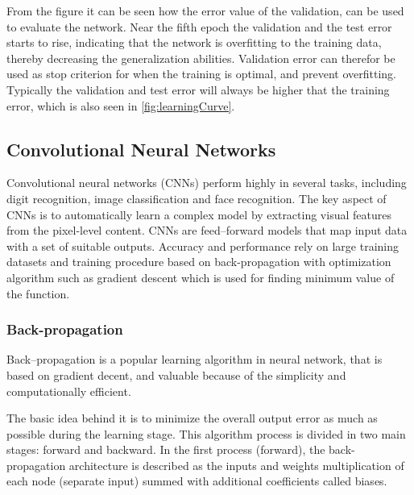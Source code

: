 From the figure it can be seen how the error value of the validation, can be used to evaluate the network. 
Near the fifth epoch the validation and the test error starts to rise, indicating that the network is overfitting to the training data, thereby decreasing the generalization abilities. 
Validation error can therefor be used as stop criterion for when the training is optimal, and prevent overfitting. 
Typically the validation and test error will always be higher that the training error, which is also seen in \autoref{fig:learningCurve}. \citep{Duda2000}
  


\subsection{Convolutional Neural Networks}
Convolutional neural networks (CNNs) perform highly in several tasks, including digit recognition, image classification and face recognition. The key aspect of CNNs is to automatically learn a complex model by extracting visual features from the pixel-level content.
CNNs are feed–forward models that map input data with a set of suitable outputs. 
Accuracy and performance rely on large training datasets and training procedure based on back-propagation with optimization algorithm such as gradient descent which is used for finding minimum value of the function.\citep{Acquarelli2017}

\subsubsection{Back-propagation}
Back–propagation is a popular learning algorithm in neural network, that is based on gradient decent, and valuable because of the simplicity and computationally efficient. \citep{Bengio2012, Duda2000}





The basic idea behind it is to minimize the overall output error as much as possible during the learning stage. This algorithm process is divided in two main stages: forward and backward. In the first process (forward), the back-propagation architecture is described as  the inputs and weights multiplication of each node (separate input) summed with additional coefficients called biases.\citep{Hameed2016} 

